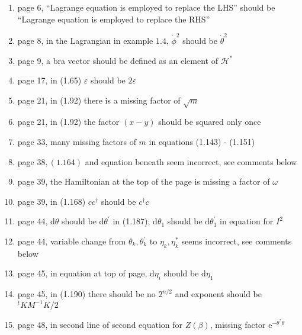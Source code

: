 \documentclass{article}
\newcommand\Dag{\textsuperscript{\dagger}}
\begin{document}
\begin{enumerate}

\item page 6\Dag, ``Lagrange equation is employed to replace the LHS'' should be ``Lagrange equation is employed to replace the RHS''
\item page 8, in the Lagrangian in example $1.4$, $\dot{\phi}^{2}$ should be $\dot{\theta}^{2}$

\item page 9, a bra vector should be defined as an element of $\mathcal{H}^{*}$

\item page 17, in (1.65) $\varepsilon$ should be $2 \varepsilon$

\item page 21, in (1.92) there is a missing factor of $\sqrt{m}$

\item page 21, in (1.92) the factor $(x-y)$ should be squared only once

\item page 33, many missing factors of $m$ in equations (1.143) - (1.151)

\item page $38,(1.164)$ and equation beneath seem incorrect, see comments below

\item page 39, the Hamiltonian at the top of the page is missing a factor of $\omega$

\item page 39, in (1.168) $c c^{\dagger}$ should be $c^{\dagger} c$

\item page 44, $\mathrm{d} \theta$ should be $\mathrm{d} \theta^{\prime}$ in (1.187); $\mathrm{d} \theta_{1}$ should be $\mathrm{d} \theta_{1}^{\prime}$ in equation for $I^{2}$

\item page 44, variable change from $\theta_{k}, \theta_{k}^{\prime}$ to $\eta_{k}, \eta_{k}^{*}$ seems incorrect, see comments below

\item page 45, in equation at top of page, $\mathrm{d} \eta_{i}$ should be $\mathrm{d} \eta_{1}$

\item page 45, in (1.190) there should be no $2^{n / 2}$ and exponent should be ${ }^{t} K M^{-1} K / 2$

\item page 48, in second line of second equation for $Z(\beta)$, missing factor $\mathrm{e}^{-\theta^{*} \theta}$


\end{enumerate}
\end{document}
